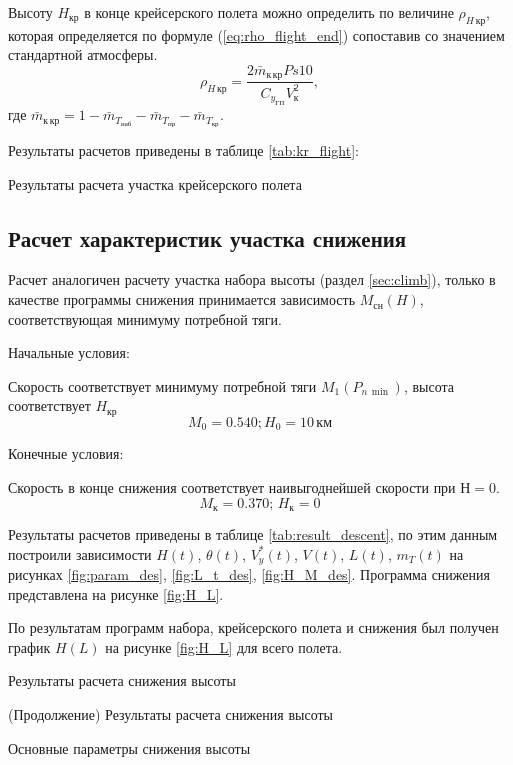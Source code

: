 Высоту $H_{кр}$ в конце крейсерского полета можно определить по величине
$\rho_{H\, кр}$, которая определяется по формуле (\ref{eq:rho_flight_end})
сопоставив со значением стандартной атмосферы.
\begin{equation}
    \rho_{H\, {кр}} = \frac{2 \bar{m}_{к\, кр} Ps 10 }{C_{y_{ГП}} V_к^2},
    \label{eq:rho_flight_end}
\end{equation}
где $\bar{m}_{к\, кр} = 1 - \bar{m}_{T_{наб}} - \bar{m}_{T_{пр}} -
\bar{m}_{T_{кр}}$.

Результаты расчетов приведены в таблице \ref{tab:kr_flight}:

\begin{table}[H]
    \centering
    \caption{Результаты расчета участка крейсерского полета}
    \label{tab:kr_flight}
    
\end{table}

\subsection{Расчет характеристик участка снижения}\label{sec:descent}

Расчет аналогичен расчету участка набора высоты (раздел \ref{sec:climb}),
только в качестве программы снижения принимается зависимость $M_{сн}(H)$,
соответствующая минимуму потребной тяги.

Начальные условия:

Скорость соответствует минимуму потребной тяги $M_1(P_{n\, \min})$, высота соответствует $H_{кр}$
\[
    M_0=0.540; H_0 = 10\, \text{км}
\]

Конечные условия:

Скорость в конце снижения соответствует наивыгоднейшей скорости при $Н=0$.
\[
    M_к = 0.370;\, H_к = 0
\]

Результаты расчетов приведены в таблице \ref{tab:result_descent}, по этим
данным построили зависимости $H(t)$, $\theta(t)$, $V_y^*(t)$, $V(t)$,
$L(t)$, $m_T(t)$ на рисунках \ref{fig:param_des}, \ref{fig:L_t_des},
\ref{fig:H_M_des}. Программа снижения представлена на рисунке \ref{fig:H_L}.

По результатам программ набора, крейсерского полета и снижения был получен график
$H(L)$ на рисунке \ref{fig:H_L} для всего полета.

\begin{sidewaystable}[ph!]
    \centering
    \caption{Результаты расчета снижения высоты}
    \label{tab:result_descent}
    
    \centering
    \addtocounter{table}{-1}
    \addtocounter{totaltables}{-1}
    \caption{(Продолжение) Результаты расчета снижения высоты}
    
    \caption{Основные параметры снижения высоты}
    
    \label{tab:minitable_descent}
\end{sidewaystable}
\newpage

